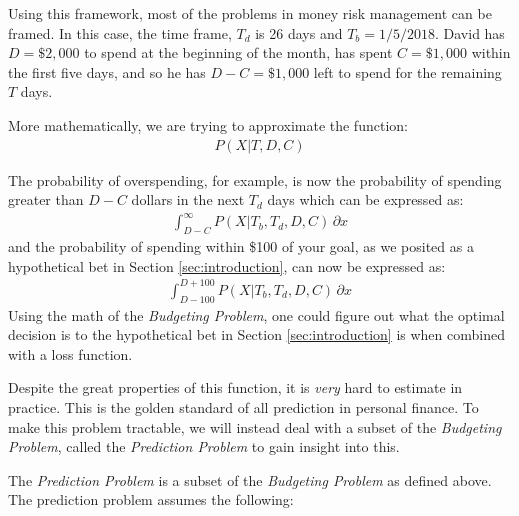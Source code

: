 \documentclass[11pt,a4paper]{article}
\begin{document}
Using this framework, most of the problems in money risk management can be framed. In this case, the time frame, $T_d$ is 26 days and $T_b = 1/5/2018$. David has $D = \$2,000$ to spend at the beginning of the month, has spent $C = \$1,000$ within the first five days, and so he has $D - C = \$1,000$ left to spend for the remaining $T$ days. 

More mathematically, we are trying to approximate the function:
\begin{align*}
P(X | T, D, C)
\end{align*} 

The probability of overspending, for example, is now the probability of spending greater than $D - C$ dollars in the next $T_d$ days which can be expressed as:
\begin{align*}
\int_{D-C}^{\infty} P(X | T_b, T_d, D, C) \,\partial x
\end{align*}
and the probability of spending within \$100 of your goal, as we posited as a hypothetical bet in Section \ref{sec:introduction}, can now be expressed as: 
\begin{align*}
\int_{D - 100}^{D + 100} P(X | T_b, T_d, D, C) \,\partial x
\end{align*}
Using the math of the \textit{Budgeting Problem}, one could figure out what the optimal decision is to the hypothetical bet in Section \ref{sec:introduction} is when combined with a loss function. 

Despite the great properties of this function, it is \textit{very} hard to estimate in practice. This is the golden standard of all prediction in personal finance. To make this problem tractable, we will instead deal with a subset of the \textit{Budgeting Problem}, called the \textit{Prediction Problem} to gain insight into this. 

The \textit{Prediction Problem} is a subset of the \textit{Budgeting Problem} as defined above. The prediction problem assumes the following:\
\end{document}

